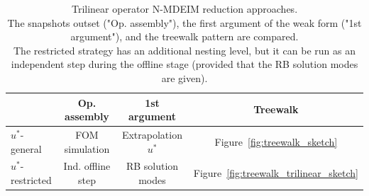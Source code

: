 \documentclass[../../thesis.tex]{subfiles}
\begin{document}
\begin{table}[h]
    \centering
    \caption{Trilinear operator N-MDEIM reduction approaches.
    \\
    The snapshots outset ("Op. assembly"), 
    the first argument of the weak form ("1st argument"),
    and the treewalk pattern are compared.
    \\
    The restricted strategy has an additional nesting level, 
    but it can be run as an independent step during the offline stage
    (provided that the RB solution modes are given).}
    \begin{tabular}{@{}lccc@{}}
    \toprule
                       & Op. assembly   & 1st argument          & Treewalk                                   \\ \midrule
    $u^{*}$-general    & FOM simulation & Extrapolation $u^{*}$ & Figure~\ref{fig:treewalk_sketch}           \\
    $u^{*}$-restricted & Ind. offline step      & RB solution modes     & Figure~\ref{fig:treewalk_trilinear_sketch} \\ \bottomrule
    \end{tabular}
    \label{tab:summary_trilinear_strategies}
\end{table}

\end{document}
